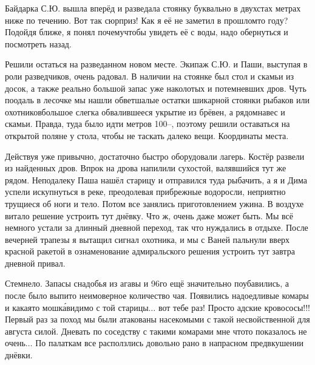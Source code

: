 Байдарка С.Ю. вышла вперёд и разведала стоянку буквально в двухстах метрах ниже по течению. Вот так сюрприз! Как я её не заметил в прошлом\sdash то году? Подойдя ближе, я понял почему\mdash чтобы увидеть её с воды, надо обернуться и посмотреть назад. 

Решили остаться на разведанном новом месте. Экипаж С.Ю. и Паши, выступая в роли разведчиков, очень радовал. В наличии на стоянке был стол и скамьи из досок, а также реально большой запас уже наколотых и потемневших дров. Чуть поодаль в лесочке мы нашли обветшалые остатки шикарной стоянки рыбаков или охотников\mdash  большое слегка обвалившееся укрытие из брёвен, а рядом\mdash  навес и скамьи. Правда, туда было идти метров 100\thinspace\nobreakdash--, поэтому решили оставаться на открытой поляне у стола, чтобы не таскать далеко вещи. Координаты места\mdash \CoordsChagodoschaSixteenNearKaban. 

Действуя уже привычно, достаточно быстро оборудовали лагерь. Костёр развели из найденных дров. Впрок на дрова напилили сухостой, валявшийся тут же рядом. Неподалеку Паша нашёл старицу и отправился туда рыбачить, а я и Дима успели искупнуться в реке, преодолевая прибрежные водоросли, неприятно трущиеся об ноги и тело. Потом все занялись приготовлением ужина. В воздухе витало решение устроить тут днёвку. Что ж, очень даже может быть. Мы всё немного устали за длинный дневной переход, так что нуждались в отдыхе. После вечерней трапезы я вытащил сигнал охотника, и мы с Ваней пальнули вверх красной ракетой в ознаменование адмиральского решения устроить тут завтра дневной привал.

Стемнело. Запасы снадобья из агавы и 96\sdash го ещё значительно поубавились, а после было выпито неимоверное количество чая. Появились надоедливые комары и какая\sdash то мошк\'{а}\mdash  видимо с той старицы$\ldots$ вот тебе раз! Просто адские кровососы!!! Первый раз за поход мы были атакованы насекомыми с такой несвойственной для августа силой. Дневать по соседству с такими комарами мне что\sdash то показалось не очень$\ldots$ По палаткам все расползлись довольно рано в напрасном предвкушении днёвки. 

\begin{center}
\end{center}
